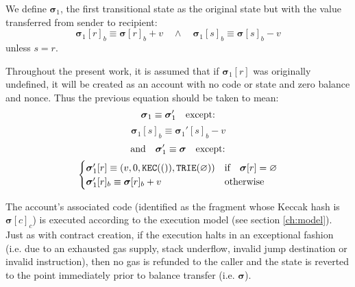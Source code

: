 \documentclass[9pt,oneside]{amsart}
\begin{document}
\begin{multicols}{2}
We define $\boldsymbol{\sigma}_1$, the first transitional state as the original state but with the value transferred from sender to recipient:
\begin{equation}
\boldsymbol{\sigma}_1[r]_b \equiv \boldsymbol{\sigma}[r]_b + v \quad\wedge\quad \boldsymbol{\sigma}_1[s]_b \equiv \boldsymbol{\sigma}[s]_b - v
\end{equation}
unless $s = r$.

Throughout the present work, it is assumed that if $\boldsymbol{\sigma}_1[r]$ was originally undefined, it will be created as an account with no code or state and zero balance and nonce. Thus the previous equation should be taken to mean:
\begin{equation}
\boldsymbol{\sigma}_1 \equiv \boldsymbol{\sigma}_1' \quad \text{except:} \\
\end{equation}
\begin{equation}
\boldsymbol{\sigma}_1[s]_b \equiv \boldsymbol{\sigma}_1'[s]_b - v
\end{equation}
\begin{equation}
\text{and}\quad \boldsymbol{\sigma}_1' \equiv \boldsymbol{\sigma} \quad \text{except:} \\
\end{equation}
\begin{equation}
\begin{cases}
\boldsymbol{\sigma}_1'[r] \equiv (v, 0, \mathtt{\tiny KEC}(()), \mathtt{\tiny TRIE}(\varnothing)) & \text{if} \quad \boldsymbol{\sigma}[r] = \varnothing \\
\boldsymbol{\sigma}_1'[r]_b \equiv \boldsymbol{\sigma}[r]_b + v & \text{otherwise}
\end{cases}
\end{equation}

The account's associated code (identified as the fragment whose Keccak hash is $\boldsymbol{\sigma}[c]_c$) is executed according to the execution model (see section \ref{ch:model}). Just as with contract creation, if the execution halts in an exceptional fashion (i.e. due to an exhausted gas supply, stack underflow, invalid jump destination or invalid instruction), then no gas is refunded to the caller and the state is reverted to the point immediately prior to balance transfer (i.e. $\boldsymbol{\sigma}$).


\end{multicols}
\end{document}
